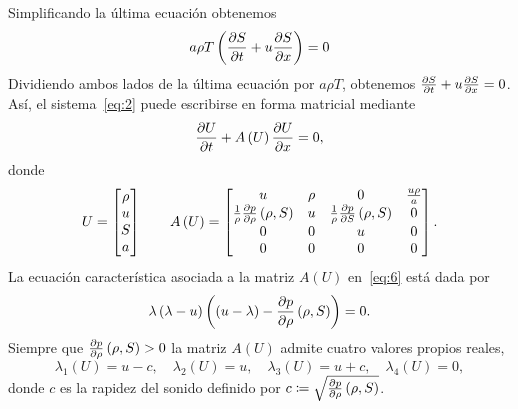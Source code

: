 \documentclass[
    8pt,
    aspectratio=1610,
    c,
    intlimits,
		handout,
    leqno,
    professionalfonts,
]{beamer}
\begin{document}
\begin{frame}
	Simplificando la última ecuación obtenemos
	\begin{equation*}
		a\rho T
		\left(\diffp{S}{t}+u\diffp{S}{x}\right)=
		0
	\end{equation*}
	Dividiendo ambos lados de la última ecuación por $a\rho T$,
	obtenemos $\diffp{S}{t}+u\diffp{S}{x}=0$.
	Así, el sistema~\eqref{eq:2} puede escribirse en forma matricial
	mediante
	\begin{equation*}
		\diffp{U}{t}+
		A\left(U\right)\diffp{U}{x}=
		0,
	\end{equation*}
	donde
	\begin{equation}\label{eq:6}
		U=\begin{bmatrix}
			\rho \\
			u    \\
			S    \\
			a
		\end{bmatrix}\qquad
		A\left(U\right)=
		\begin{bmatrix}
			u                                                & \rho & 0                                             & \frac{u\rho}{a} \\
			\frac{1}{\rho}\diffp{p}{\rho}\left(\rho,S\right) & u    & \frac{1}{\rho}\diffp{p}{S}\left(\rho,S\right) & 0               \\
			0                                                & 0    & u                                             & 0               \\
			0                                                & 0    & 0                                             & 0
		\end{bmatrix}.
	\end{equation}
	La ecuación característica asociada a la matriz $A\left(U\right)$
	en~\eqref{eq:6} está dada por
	\begin{equation*}
		\lambda\left(\lambda-u\right)
		\left(\left(u-\lambda\right)-\diffp{p}{\rho}\left(\rho,S\right)\right)=
		0.
	\end{equation*}
	Siempre que $\diffp{p}{\rho}\left(\rho,S\right)>0$
	la matriz $A\left(U\right)$ admite cuatro valores propios reales,
	\begin{equation*}
		\lambda_{1}\left(U\right)=u-c,\quad
		\lambda_{2}\left(U\right)=u,\quad
		\lambda_{3}\left(U\right)=u+c,\quad
		\lambda_{4}\left(U\right)=0,
	\end{equation*}
	donde $c$ es la rapidez del sonido definido por
	$c\coloneqq\sqrt{\diffp{p}{\rho}\left(\rho, S\right)}$.
\end{frame}
\end{document}
